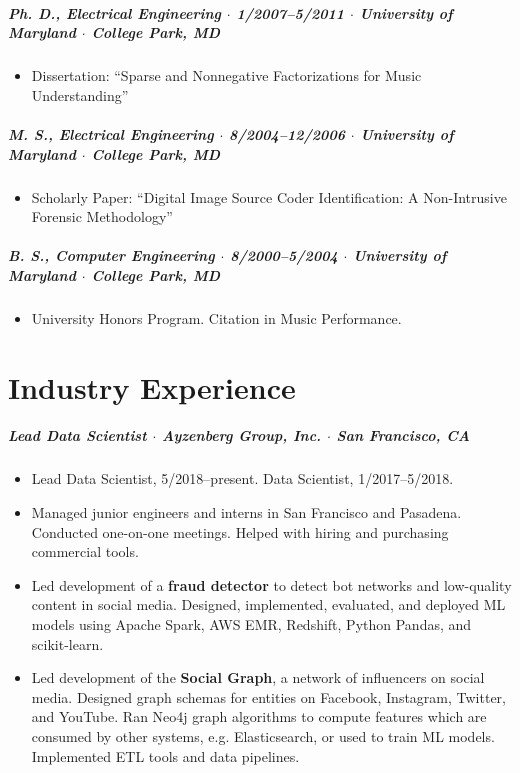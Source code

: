 \documentclass[10pt,letterpaper]{article}
\begin{document}
\subparagraph{Ph. D., Electrical Engineering  $\cdot$ \textnormal{1/2007--5/2011} $\cdot$ University of Maryland  $\cdot$ \textnormal{College Park, MD}}
\begin{itemize}
    \item Dissertation: ``Sparse and Nonnegative Factorizations for Music Understanding''
\end{itemize}

\subparagraph{M. S., Electrical Engineering  $\cdot$ \textnormal{8/2004--12/2006} $\cdot$ University of Maryland  $\cdot$ \textnormal{College Park, MD}}
\begin{itemize}
    \item Scholarly Paper: ``Digital Image Source Coder Identification: A Non-Intrusive Forensic Methodology''
\end{itemize}

\subparagraph{B. S., Computer Engineering  $\cdot$ \textnormal{8/2000--5/2004} $\cdot$ University of Maryland  $\cdot$ \textnormal{College Park, MD}}
\begin{itemize}
    \item University Honors Program.  Citation in Music Performance.
\end{itemize}


\section*{Industry Experience}

\subparagraph{Lead Data Scientist $\cdot$ Ayzenberg Group, Inc.  $\cdot$ \textnormal{San Francisco, CA}}
\begin{itemize}
    \item Lead Data Scientist, 5/2018--present. Data Scientist, 1/2017--5/2018.
    \item Managed junior engineers and interns in San Francisco and Pasadena. Conducted one-on-one meetings. Helped with hiring and purchasing commercial tools.
    \item Led development of a \textbf{fraud detector} to detect bot networks and low-quality content in social media. Designed, implemented, evaluated, and deployed ML models using Apache Spark, AWS EMR, Redshift, Python Pandas, and scikit-learn.
    \item Led development of the \textbf{Social Graph}, a network of influencers on social media. Designed graph schemas for entities on Facebook, Instagram, Twitter, and YouTube. Ran Neo4j graph algorithms to compute features which are consumed by other systems, e.g. Elasticsearch, or used to train ML models. Implemented ETL tools and data pipelines.
\end{itemize}
\end{document}
